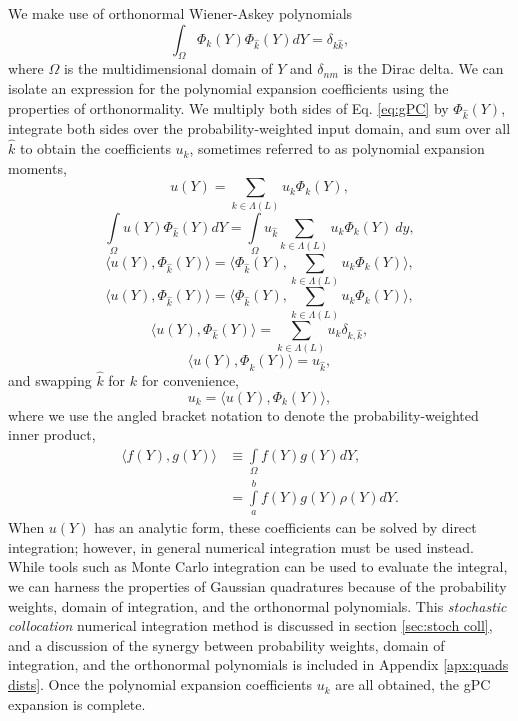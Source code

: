 We make use of orthonormal Wiener-Askey polynomials
\begin{equation}
  \int_\Omega \Phi_k(Y)\Phi_{\hat k}(Y) dY = \delta_{k\hat k},
\end{equation}
where $\Omega$ is the multidimensional domain of $Y$ and $\delta_{nm}$
is the Dirac delta.  We can isolate an expression for the polynomial expansion coefficients using the
properties of orthonormality.
We multiply both sides of Eq. \ref{eq:gPC} by
$\Phi_{\hat k}(Y)$, integrate both sides over the probability-weighted input domain, and sum over all $\hat k$
to obtain the coefficients $u_k$, sometimes referred to as polynomial expansion moments,
\begin{equation}
  u(Y) = \sum_{k\in\Lambda(L)} u_k\Phi_k(Y),
\end{equation}
\begin{equation}
  \int\limits_\Omega u(Y)\Phi_{\hat k}(Y) dY = \int\limits_\Omega u_{\hat k} \sum_{k\in\Lambda(L)}
           u_k\Phi_k(Y)\ dy,
\end{equation}
\begin{equation}
  \langle u(Y),\Phi_{\hat k}(Y)\rangle = \langle \Phi_{\hat k}(Y),\sum_{k\in\Lambda(L)}
           u_k\Phi_k(Y) \rangle,
\end{equation}
\begin{equation}
  \langle u(Y),\Phi_{\hat k}(Y)\rangle = \langle \Phi_{\hat k}(Y),\sum_{k\in\Lambda(L)}
           u_k\Phi_k(Y) \rangle,
\end{equation}
\begin{equation}
  \langle u(Y),\Phi_{\hat k}(Y)\rangle = \sum_{k\in\Lambda(L)} u_k \delta_{k,\hat k},
\end{equation}
\begin{equation}
  \langle u(Y),\Phi_{\hat k}(Y)\rangle = u_{\hat k} ,
\end{equation}
and swapping $\hat k$ for $k$ for convenience,
\begin{equation}\label{eq:polycoeff}
  u_k = \langle u(Y),\Phi_k(Y) \rangle,
\end{equation}
where we use the angled bracket notation to denote the probability-weighted inner product,
\begin{align}
  \langle f(Y),g(Y) \rangle &\equiv \int\limits_\Omega f(Y)g(Y) dY, \\
    &= \int\limits_a^b f(Y)g(Y)\rho(Y) dY.
\end{align}
When $u(Y)$ has an analytic form, these coefficients can be solved by direct integration; however, in general
numerical integration must be used instead.  While tools such as Monte Carlo integration can
be used to evaluate the integral, we can harness the properties of Gaussian quadratures because of the
probability weights, domain of integration, and the orthonormal polynomials.
This \emph{stochastic collocation} numerical integration method is discussed in section \ref{sec:stoch
coll}, and a discussion of the synergy between probability weights, domain of integration, and the 
orthonormal polynomials is included in Appendix \ref{apx:quads dists}.  Once the polynomial expansion 
coefficients $u_k$ are all obtained, the gPC expansion is complete.

